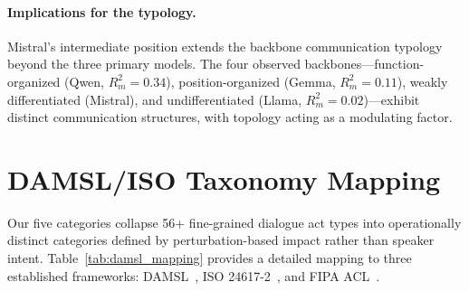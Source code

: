 \paragraph{Implications for the typology.} Mistral's intermediate position extends the backbone communication typology beyond the three primary models. The four observed backbones---function-organized (Qwen, $R^2_m = 0.34$), position-organized (Gemma, $R^2_m = 0.11$), weakly differentiated (Mistral), and undifferentiated (Llama, $R^2_m = 0.02$)---exhibit distinct communication structures, with topology acting as a modulating factor.

\section{DAMSL/ISO Taxonomy Mapping}
\label{app:damsl-mapping}

Our five categories collapse 56+ fine-grained dialogue act types into operationally distinct categories defined by perturbation-based impact rather than speaker intent. Table~\ref{tab:damsl_mapping} provides a detailed mapping to three established frameworks: DAMSL~\cite{core_damsl_1997}, ISO 24617-2~\cite{bunt_iso_2012}, and FIPA ACL~\cite{fipa_acl_2002}.

\begin{table}[ht]
\centering
\caption{Mapping between our communication function taxonomy and established dialogue act frameworks. Each row shows the primary corresponding categories and the key distinction that motivates our grouping.}
\label{tab:damsl_mapping}
\small
{}%
\end{table}

